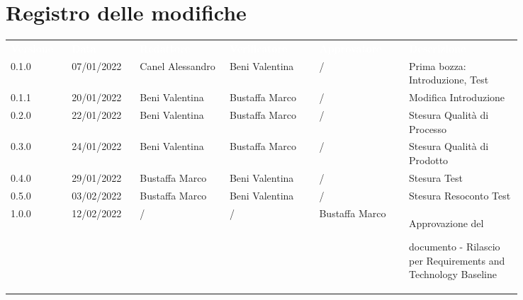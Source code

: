 \section*{Registro delle modifiche}

{\renewcommand{\arraystretch}{1.5}
\scriptsize
\begin{tabular}{p{0.10\linewidth}p{0.10\linewidth}p{0.15\linewidth}p{0.15\linewidth}p{0.15\linewidth}p{0.19\linewidth}}
	\rowcolor[RGB]{33, 73, 50}
	\textcolor{white}{\textbf{Versione}} & \textcolor{white}{\textbf{Data}} &
	\textcolor{white}{\textbf{Redattore}} & \textcolor{white}{\textbf{Verificatore}} &
	\textcolor{white}{\textbf{Approvatore}} & \textcolor{white}{\textbf{Descrizione}}\\
	\rowcolor[RGB]{216, 235, 171}
	0.1.0 & 07/01/2022 & Canel Alessandro& Beni Valentina &/& Prima bozza: Introduzione, Test\\
	\rowcolor[RGB]{233, 245, 206}
	0.1.1 & 20/01/2022 & Beni Valentina& Bustaffa Marco &/& Modifica Introduzione\\
	\rowcolor[RGB]{216, 235, 171}
	0.2.0 & 22/01/2022 & Beni Valentina& Bustaffa Marco &/& Stesura Qualità di Processo\\
	\rowcolor[RGB]{233, 245, 206}
	0.3.0 & 24/01/2022 & Beni Valentina& Bustaffa Marco &/& Stesura Qualità di Prodotto\\
	\rowcolor[RGB]{216, 235, 171}
	0.4.0 & 29/01/2022 & Bustaffa Marco& Beni Valentina &/& Stesura Test\\
	\rowcolor[RGB]{233, 245, 206}
	0.5.0 & 03/02/2022 & Bustaffa Marco& Beni Valentina &/& Stesura Resoconto Test\\
	\rowcolor[RGB]{216, 235, 171}
	1.0.0 & 12/02/2022 & / & / & Bustaffa Marco & Approvazione del \par documento - Rilascio per Requirements and Technology Baseline\\ 
\end{tabular}
}
